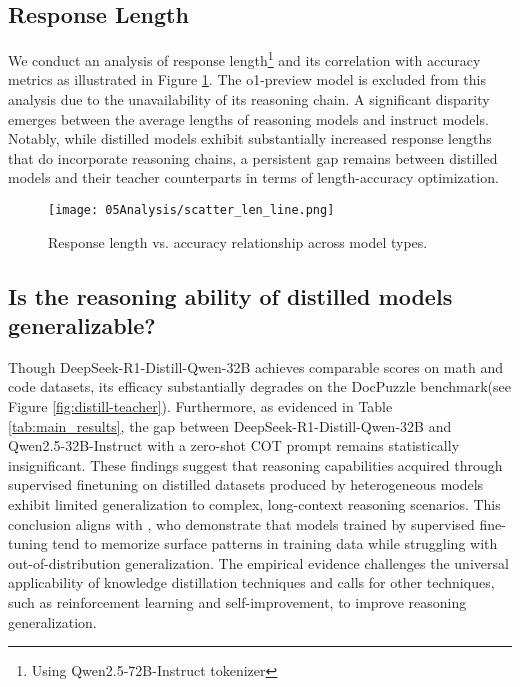 \subsection{Response Length}
We conduct an analysis of response length\footnote{Using Qwen2.5-72B-Instruct tokenizer}  and its correlation with accuracy metrics as illustrated in Figure \ref{fig:len_performance}.
The o1-preview model is excluded from this analysis due to the unavailability of its reasoning chain.
A significant disparity emerges between the average lengths of reasoning models and instruct models.
Notably, while distilled models exhibit substantially increased response lengths that do incorporate reasoning chains, a persistent gap remains between distilled models and their teacher counterparts in terms of length-accuracy optimization.


\begin{figure}
    \centering
    \texttt{[image: 05Analysis/scatter\_len\_line.png]}
    \caption{Response length vs. accuracy relationship across model types.}
    \label{fig:len_performance}
\end{figure}


\subsection{Is the reasoning ability of distilled models generalizable?}
Though DeepSeek-R1-Distill-Qwen-32B achieves comparable scores on math and code datasets\cite{deepseekai2025deepseekr1incentivizingreasoningcapability}, its efficacy substantially degrades on the DocPuzzle benchmark(see Figure \ref{fig:distill-teacher}). 
Furthermore, as evidenced in Table \ref{tab:main_results}, the gap between DeepSeek-R1-Distill-Qwen-32B and Qwen2.5-32B-Instruct with a zero-shot COT prompt remains statistically insignificant.
These findings suggest that reasoning capabilities acquired through supervised finetuning on distilled datasets produced by heterogeneous models exhibit limited generalization to complex, long-context reasoning scenarios.
This conclusion aligns with \citet{chu2025sft}, who demonstrate that models trained by supervised fine-tuning tend to memorize surface patterns in training data while struggling with out-of-distribution generalization. 
The empirical evidence challenges the universal applicability of knowledge distillation techniques and calls for other techniques,  such as reinforcement learning and self-improvement, to improve reasoning generalization.



